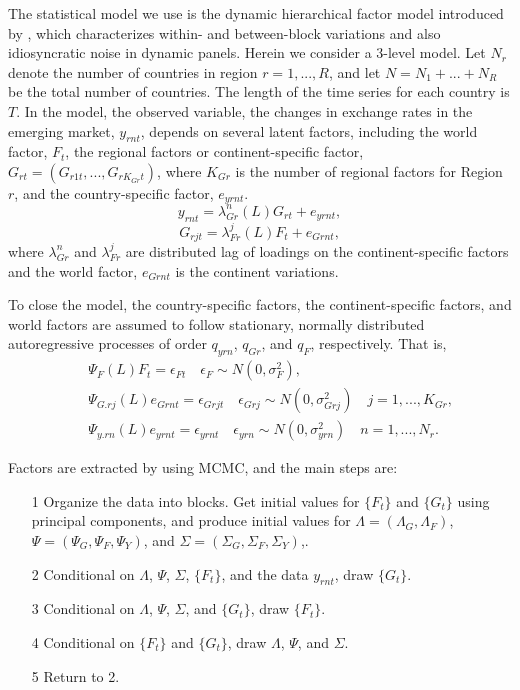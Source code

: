\documentclass[12pt]{article}
\numberwithin{equation}{section}
\begin{document}
The statistical model we use is the dynamic hierarchical factor model introduced by \cite{Moenchetal2013}, which characterizes within- and between-block variations and also idiosyncratic noise in dynamic panels. Herein we consider a 3-level model. Let $N_r$ denote the number of countries in region $r=1,...,R$, and let $N=N_1+...+N_R$ be the total number of countries. The length of the time series for each country is $T$. In the model, the observed variable, the changes in exchange rates in the emerging market, $y_{rnt}$, depends on several latent factors, including the world factor, $F_t$, the regional factors or continent-specific factor, $G_{rt}=(G_{r1t},...,G_{rK_{Gr}t})$, where $K_{Gr}$ is the number of regional factors for Region $r$, and the country-specific factor, $e_{yrnt}$.
\begin{equation}
y_{rnt}=\lambda^n_{Gr}(L)G_{rt}+e_{yrnt},
\label{eq:Model_G}
\end{equation}
\begin{equation}
G_{rjt}=\lambda^j_{Fr}(L)F_{t}+e_{Grnt},
\label{eq:Model_F}
\end{equation}
where $\lambda^n_{Gr}$ and $\lambda^j_{Fr}$ are distributed lag of loadings on the continent-specific factors and the world factor, $e_{Grnt}$ is the continent variations.

To close the model, the country-specific factors, the continent-specific factors, and world factors are assumed to follow stationary, normally distributed autoregressive processes of order $q_{yrn}$, $q_{Gr}$, and $q_{F}$, respectively. That is,
\begin{eqnarray*}
&&\Psi_{F}(L)F_t=\epsilon_{Ft}\,\,\,\,\,\,\epsilon_{F}\sim N(0,\sigma^2_F),\\
&&\Psi_{G.rj}(L)e_{Grnt}=\epsilon_{Grjt}\,\,\,\,\,\,\epsilon_{Grj}\sim N(0,\sigma^2_{Grj})\,\,\,\,\,\, j=1,...,K_{Gr},\\
&&\Psi_{y.rn}(L)e_{yrnt}=\epsilon_{yrnt}\,\,\,\,\,\,\epsilon_{yrn}\sim N(0,\sigma^2_{yrn})\,\,\,\,\,\, n=1,...,N_r.
\end{eqnarray*}

Factors are extracted by using MCMC, and the main steps are:
\begin{itemize}
\item[1] Organize the data into blocks. Get initial values for $\{F_t\}$ and $\{G_t\}$ using principal components, and produce initial values for $\Lambda=(\Lambda_G, \Lambda_F)$, $\Psi=(\Psi_G, \Psi_F, \Psi_Y)$, and $\Sigma=(\Sigma_G, \Sigma_F, \Sigma_Y)$,.
\item[2] Conditional on $\Lambda$, $\Psi$, $\Sigma$, $\{F_t\}$, and the data $y_{rnt}$, draw $\{G_t\}$.
\item[3] Conditional on $\Lambda$, $\Psi$, $\Sigma$, and $\{G_t\}$, draw $\{F_t\}$.
\item[4] Conditional on $\{F_t\}$ and $\{G_t\}$, draw $\Lambda$, $\Psi$, and $\Sigma$.
\item[5] Return to 2.
\end{itemize}
\end{document}

